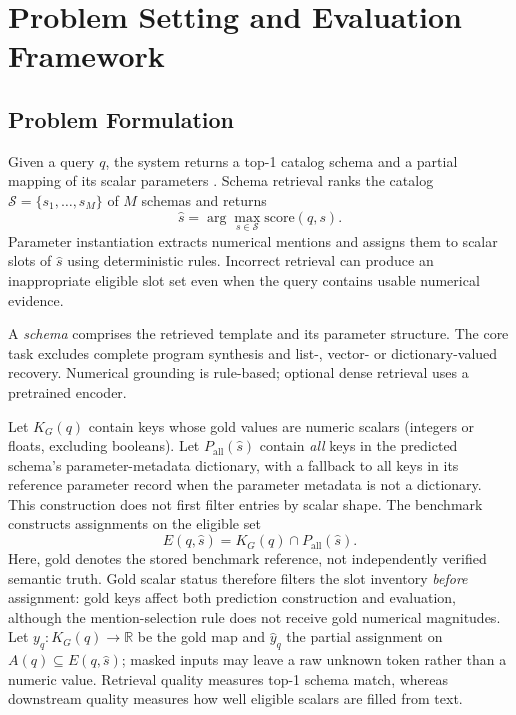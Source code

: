 \documentclass[pdflatex,iicol,sn-basic,Numbered]{sn-jnl}
\begin{document}
\section{Problem Setting and Evaluation Framework}
\label{sec:task}
\subsection{Problem Formulation}
\label{subsec:method_problem}

Given a query $q$, the system returns a top-1 catalog schema and a partial mapping of its scalar parameters \cite{nlp4lp_dataset}. Schema retrieval ranks the catalog $\mathcal{S}=\{s_1,\dots,s_M\}$ of $M$ schemas and returns
\begin{equation}
\hat{s}=\arg\max_{s \in \mathcal{S}} \mathrm{score}(q,s).
\label{eq:top1_schema}
\end{equation}
Parameter instantiation extracts numerical mentions and assigns them to scalar slots of $\hat{s}$ using deterministic rules. Incorrect retrieval can produce an inappropriate eligible slot set even when the query contains usable numerical evidence.

A \emph{schema} comprises the retrieved template and its parameter structure. The core task excludes complete program synthesis and list-, vector- or dictionary-valued recovery. Numerical grounding is rule-based; optional dense retrieval uses a pretrained encoder.

Let $K_G(q)$ contain keys whose gold values are numeric scalars (integers or floats, excluding booleans). Let $P_{\mathrm{all}}(\hat{s})$ contain \emph{all} keys in the predicted schema's parameter-metadata dictionary, with a fallback to all keys in its reference parameter record when the parameter metadata is not a dictionary. This construction does not first filter entries by scalar shape. The benchmark constructs assignments on the eligible set
\begin{equation}
E(q,\hat{s}) = K_G(q) \cap P_{\mathrm{all}}(\hat{s}).
\label{eq:eligible_slots}
\end{equation}
Here, gold denotes the stored benchmark reference, not independently verified semantic truth. Gold scalar status therefore filters the slot inventory \emph{before} assignment: gold keys affect both prediction construction and evaluation, although the mention-selection rule does not receive gold numerical magnitudes. Let $y_q : K_G(q) \to \mathbb{R}$ be the gold map and $\hat{y}_{q}$ the partial assignment on $A(q) \subseteq E(q,\hat{s})$; masked inputs may leave a raw unknown token rather than a numeric value. Retrieval quality measures top-1 schema match, whereas downstream quality measures how well eligible scalars are filled from text.
\end{document}
